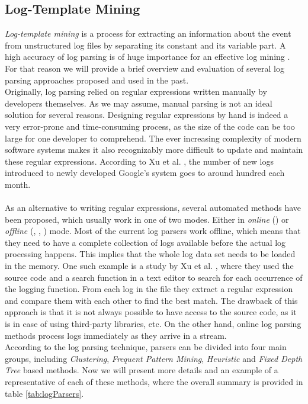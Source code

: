 \subsection{Log-Template Mining}\label{log_template_mining}

\textit{Log-template mining} is a process for extracting an information about the event from unstructured log files by separating its constant and its variable part. A high accuracy of log parsing is of huge importance for an effective log mining \cite{logParsingEvaluation2016}. For that reason we will provide a brief overview and evaluation of several log parsing approaches proposed and used in the past. \\
    
Originally, log parsing relied on regular expressions written manually by developers themselves. As we may assume, manual parsing is not an ideal solution for several reasons. Designing regular expressions by hand is indeed a very error-prone and time-consuming process, as the size of the code can be too large for one developer to comprehend. The ever increasing complexity of modern software systems makes it also recognizably more difficult to update and maintain these regular expressions. According to Xu et al. \cite{xu2009}, the number of new logs introduced to newly developed Google's system goes to around hundred each month. \\
\\
As an alternative to writing regular expressions, several automated methods have been proposed, which usually work in one of two modes. Either in \textit{online} (\cite{drain2017}) or \textit{offline} (\cite{vaarandi2003}, \cite{logsig2011}, \cite{Makanju2009ALA}) mode. Most of the current log parsers work offline, which means that they need to have a complete collection of logs available before the actual log processing happens. This implies that the whole log data set needs to be loaded in the memory. One such example is a study by Xu et al. \cite{xu2008}, where they used the source code and a search function in a text editor to search for each occurrence of the logging function. From each log in the file they extract a regular expression and compare them with each other to find the best match. The drawback of this approach is that it is not always possible to have access to the source code, as it is in case of using third-party libraries, etc. On the other hand, online log parsing methods process logs immediately as they arrive in a stream. \\
According to the log parsing technique, parsers can be divided into four main groups, including \textit{Clustering}, \textit{Frequent Pattern Mining}, \textit{Heuristic} and \textit{Fixed Depth Tree} based methods. Now we will present more details and an example of a representative of each of these methods, where the overall summary is provided in table \ref{tab:logParsers}.  \\

